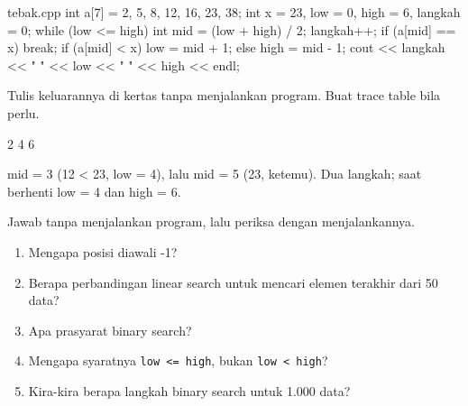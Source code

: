 \documentclass[a4paper]{article}
\begin{document}
\begin{MKode}{tebak.cpp}
int a[7] = {2, 5, 8, 12, 16, 23, 38};
int x = 23, low = 0, high = 6, langkah = 0;
while (low <= high) {
    int mid = (low + high) / 2;
    langkah++;
    if (a[mid] == x) break;
    if (a[mid] < x) low = mid + 1;
    else high = mid - 1;
}
cout << langkah << " " << low << " " << high << endl;
\end{MKode}
\begin{Tebak}[]
Tulis keluarannya di kertas tanpa menjalankan program. Buat trace table bila perlu.
\end{Tebak}
\begin{Jawaban}[]
\begin{MKeluaran}[]
2 4 6
\end{MKeluaran}
mid = 3 (12 < 23, low = 4), lalu mid = 5 (23, ketemu). Dua langkah; saat berhenti low = 4 dan high = 6.
\end{Jawaban}
\par\vspace{4pt}\par\vspace{6pt}
Jawab tanpa menjalankan program, lalu periksa dengan menjalankannya.
\begin{enumerate}
\item Mengapa posisi diawali -1?
\item Berapa perbandingan linear search untuk mencari elemen terakhir dari 50 data?
\item Apa prasyarat binary search?
\item Mengapa syaratnya \texttt{low <= high}, bukan \texttt{low < high}?
\item Kira-kira berapa langkah binary search untuk 1.000 data?
\end{enumerate}
\end{document}
